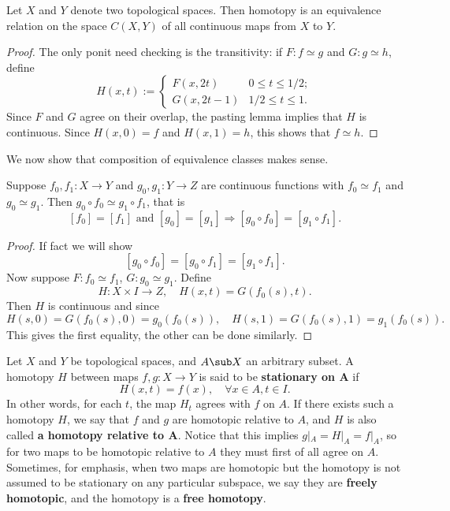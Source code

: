 \begin{proposition}
Let $X$ and $Y$ denote two topological spaces. Then homotopy is an equivalence relation on the space $C(X,Y)$ of all continuous maps from $X$ to $Y$.
\end{proposition}
\begin{proof}
The only ponit need checking is the transitivity: if $F:f\simeq g$ and $G:g\simeq h$, define
\[H(x,t):=\begin{cases}
F(x,2t)&0\leq t\leq 1/2;\\
G(x,2t-1)&1/2\leq t\leq 1.
\end{cases}\]
Since $F$ and $G$ agree on their overlap, the pasting lemma implies that $H$ is continuous. Since $H(x,0)=f$ and $H(x,1)=h$, this shows that $f\simeq h$.
\end{proof}

We now show that composition of equivalence classes makes sense.

\begin{proposition}
Suppose $f_0,f_1:X\to Y$ and $g_0,g_1:Y\to Z$ are continuous functions with $f_0\simeq f_1$ and $g_0\simeq g_1$. Then $g_0\circ f_0\simeq g_1\circ f_1$, that is
\[[f_0]=[f_1]\text{ and }[g_0]=[g_1]\Rightarrow [g_0\circ f_0]=[g_1\circ f_1].\]
\end{proposition}
\begin{proof}
If fact we will show
\[[g_0\circ f_0]=[g_0\circ f_1]=[g_1\circ f_1].\]
Now suppose $F:f_0\simeq f_1$, $G:g_0\simeq g_1$. Define
\[H:X\times I\to Z,\quad H(x,t)=G(f_0(s),t).\]
Then $H$ is continuous and since
\[H(s,0)=G(f_0(s),0)=g_0(f_0(s)),\quad H(s,1)=G(f_0(s),1)=g_1(f_0(s)).\]
This gives the first equality, the other can be done similarly.
\end{proof}

Let $X$ and $Y$ be topological spaces, and $A\sub X$ an arbitrary subset. A homotopy $H$ between maps $f,g:X\to Y$ is said to be \textbf{stationary on $\bm{A}$} if
\[H(x,t)=f(x),\quad\forall x\in A,t\in I.\]
In other words, for each $t$, the map $H_t$ agrees with $f$ on $A$. If there exists such a homotopy $H$, we say that $f$ and $g$ are homotopic relative to $A$, and $H$ is also called \textbf{a homotopy relative to $\bm{A}$}. Notice that this implies $g|_A=H|_A=f|_A$, so for two maps to be homotopic relative to $A$ they must first of all agree on $A$. Sometimes, for emphasis, when two maps are homotopic but the homotopy is not assumed to be
stationary on any particular subspace, we say they are \textbf{freely homotopic}, and the homotopy is a \textbf{free homotopy}.

